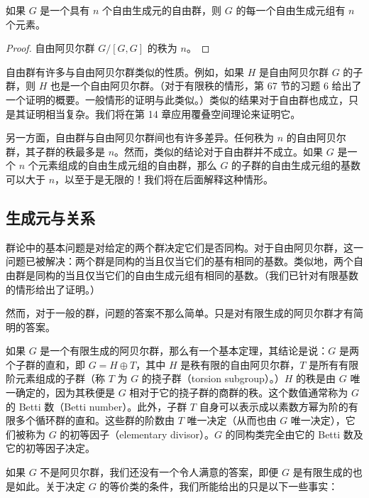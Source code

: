 \documentclass[../../main.tex]{subfiles}
\begin{document}
\begin{corollary}\label{corollary:ch11-free-group-rank}
如果 $G$ 是一个具有 $n$ 个自由生成元的自由群，则 $G$ 的每一个自由生成元组有 $n$ 个元素。
\end{corollary}

\begin{proof}
自由阿贝尔群 $G/[G,G]$ 的秩为 $n$。
\end{proof}

自由群有许多与自由阿贝尔群类似的性质。例如，如果 $H$ 是自由阿贝尔群 $G$ 的子群，则 $H$ 也是一个自由阿贝尔群。（对于有限秩的情形，第 67 节的习题 6 给出了一个证明的概要。一般情形的证明与此类似。）类似的结果对于自由群也成立，只是其证明相当复杂。我们将在第 14 章应用覆叠空间理论来证明它。

另一方面，自由群与自由阿贝尔群间也有许多差异。任何秩为 $n$ 的自由阿贝尔群，其子群的秩最多是 $n$。然而，类似的结论对于自由群并不成立。如果 $G$ 是一个 $n$ 个元素组成的自由生成元组的自由群，那么 $G$ 的子群的自由生成元组的基数可以大于 $n$，以至于是无限的！我们将在后面解释这种情形。

\subsection*{生成元与关系}

群论中的基本问题是对给定的两个群决定它们是否同构。对于自由阿贝尔群，这一问题已被解决：两个群是同构的当且仅当它们的基有相同的基数。类似地，两个自由群是同构的当且仅当它们的自由生成元组有相同的基数。（我们已针对有限基数的情形给出了证明。）

然而，对于一般的群，问题的答案不那么简单。只是对有限生成的阿贝尔群才有简明的答案。

如果 $G$ 是一个有限生成的阿贝尔群，那么有一个基本定理，其结论是说：$G$ 是两个子群的直和，即 $G=H\oplus T$，其中 $H$ 是秩有限的自由阿贝尔群，$T$ 是所有有限阶元素组成的子群（称 $T$ 为 $G$ 的挠子群（torsion subgroup）。）$H$ 的秩是由 $G$ 唯一确定的，因为其秩便是 $G$ 相对于它的挠子群的商群的秩。这个数值通常称为 $G$ 的 Betti 数（Betti number）。此外，子群 $T$ 自身可以表示成以素数方幂为阶的有限多个循环群的直和。这些群的阶数由 $T$ 唯一决定（从而也由 $G$ 唯一决定），它们被称为 $G$ 的初等因子（elementary divisor）。$G$ 的同构类完全由它的 Betti 数及它的初等因子决定。

如果 $G$ 不是阿贝尔群，我们还没有一个令人满意的答案，即便 $G$ 是有限生成的也是如此。关于决定 $G$ 的等价类的条件，我们所能给出的只是以下一些事实：
\end{document}
